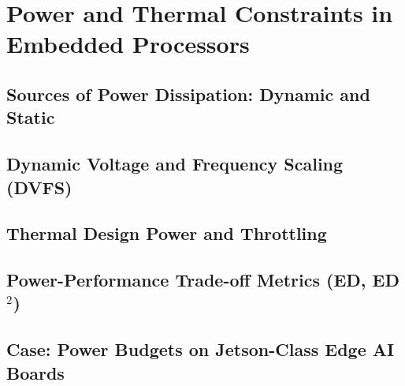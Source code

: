 \chapter{Power and Thermal Constraints in Embedded Processors}
\label{ch:power-thermal}


\section{Sources of Power Dissipation: Dynamic and Static}

\section{Dynamic Voltage and Frequency Scaling (DVFS)}

\section{Thermal Design Power and Throttling}

\section{Power-Performance Trade-off Metrics (ED, ED\texorpdfstring{$^2$}{2})}

\section{Case: Power Budgets on Jetson-Class Edge AI Boards}
